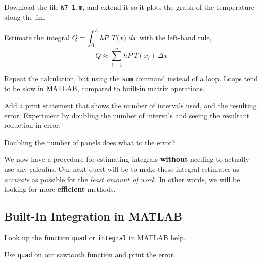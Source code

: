 \newpage

\problem Download the file \texttt{W7\_1.m}, and extend it so it
  plots the graph of the temperature along the fin.

\vsc

\problem Estimate the integral $\displaystyle Q = \int_0^L h P ~T(x) ~dx$ with
  the left-hand rule,
$$ Q \approx \sum_{i=1}^n h P ~T(x_i)~ \Delta x$$

\vsc

\problem Repeat the calculation, but using the \texttt{sum} command
instead of a loop.  Loops tend to be slow in MATLAB, compared to 
built-in matrix operations.

\vsc

\newpage

\problem Add a print statement that shows the number of intervals
  used, and the resulting error.  Experiment by doubling the number of
  intervals and seeing the resultant reduction in error.

\vsc

\problem Doubling the number of panels does what to the error?

\vfill

\newpage





We now have a procedure for estimating integrals {\bf without} needing
to actually use any calculus.  Our next quest will be to make these
integral estimates as {\em accurate} as possible for the {\em least
  amount of work}.  In other words, we will be looking for more {\bf
  efficient} methods.

\newpage

\subsection*{Built-In Integration in MATLAB }

\problem Look up the function \texttt{quad} or \texttt{integral} in MATLAB help.

\vsc

\problem Use \texttt{quad} on our sawtooth function and print the error.

